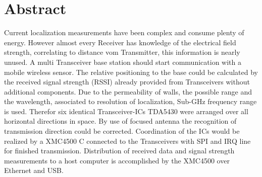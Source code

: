 \newpage
\chapter*{Abstract}
\label{sec:abstract}
\pagestyle{scrheadings}

Current localization measurements have been complex and consume plenty of energy. However almost every Receiver has knowledge of the electrical field strength, correlating to distance vom Transmitter, this information is nearly unused. A multi Transceiver base station should start communication with a mobile wireless sensor. The relative positioning to the base could be calculated by the received signal strength (RSSI) already provided from Transceivers without additional components. Due to the permeability of walls, the possible range and the wavelength, associated to resolution of localization,   Sub-GHz frequency range is used.  Therefor six identical Transceiver-ICs TDA5430 were arranged over all horizontal directions in space. By use of focused antenna the recognition of transmission direction could be corrected. Coordination of the ICs would be realized by a XMC4500 \textmu C connected to the Transceivers with SPI and IRQ line for finished transmission. Distribution of received data and signal strength measurements to a host computer is accomplished by the XMC4500 over Ethernet and USB.